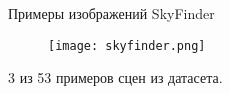 
\begin{frame}{Примеры изображений SkyFinder}
\begin{figure}
\centering
\texttt{[image: skyfinder.png]}
\end{figure}
    3 из 53 примеров сцен из датасета.
\end{frame}